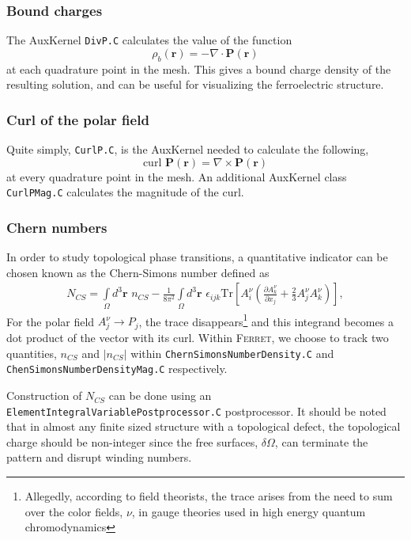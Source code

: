\documentclass[16pt]{article} %
\begin{document}
\subsubsection{Bound charges}
%
The AuxKernel \texttt{DivP.C} calculates the value of the function
%
$$\rho_b (\textbf{r} ) = - \nabla \cdot \textbf{P} (\textbf{r} )$$
%
at each quadrature point in the mesh.
%
This gives a bound charge density of the resulting solution, and can be useful for visualizing the ferroelectric structure.
%
\subsubsection{Curl of the polar field}
%
Quite simply, \texttt{CurlP.C}, is the AuxKernel needed to calculate the following,
%
$$\mathrm{curl} \,\, \textbf{P} (\textbf{r}) =  \nabla \times \textbf{P} (\textbf{r})$$
%
at every quadrature point in the mesh. An additional AuxKernel class \texttt{CurlPMag.C} calculates the magnitude of the curl.
%
\subsubsection{Chern numbers}
%
In order to study topological phase transitions, a quantitative indicator can be chosen known as the Chern-Simons number defined as
%
\begin{align}\nonumber
N_{CS} = \int\limits_\Omega d^3 \textbf{r} \,\,  n_{CS} - \frac{1}{8 \pi^2} \int\limits_\Omega d^3 \textbf{r} \,\, \epsilon_{ijk} \mathrm{Tr} \left[A_i^\nu \left(\frac{\partial A_k^\nu}{\partial x_j} + \frac{2}{3} A_j^\nu A_k^\nu \right) \right],
\end{align}
%
For the polar field $A_j^\nu \to P_j$, the trace disappears\footnote{Allegedly, according to field theorists, the trace arises from the need to sum over the color fields, $\nu$, in gauge theories used in high energy quantum chromodynamics} and this integrand becomes a dot product of the vector with its curl. %
%
Within \textsc{Ferret}, we choose to track two quantities, $n_{CS}$ and $|n_{CS}|$ within \texttt{ChernSimonsNumberDensity.C} and \texttt{ChenSimonsNumberDensityMag.C} respectively. 

Construction of $N_{CS}$ can be done using an 
\texttt{ElementIntegralVariablePostprocessor.C} postprocessor.
%
It should be noted that in almost any finite sized structure with a topological defect, the topological charge should be non-integer since the free surfaces, $\delta \Omega$, can terminate the pattern and disrupt winding numbers.
% 
\end{document}
